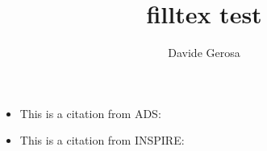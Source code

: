 \documentclass[]{article}
\begin{document}
\title{filltex test}

\author{Davide Gerosa}

\maketitle


\begin{itemize}
\item This is a citation from ADS: \cite{2016PhRvL.116f1102A}
\item This is a citation from INSPIRE: \cite{Abbott:2016blz}
\end{itemize}


\end{document}
